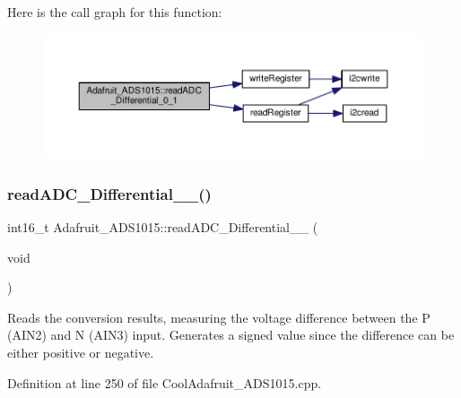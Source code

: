 Here is the call graph for this function\+:
\nopagebreak
\begin{figure}[H]
\begin{center}
\leavevmode
\includegraphics[width=350pt]{class_adafruit___a_d_s1015_a56582333958e66efaccd3d4a8a47e3ff_cgraph}
\end{center}
\end{figure}
\mbox{\label{class_adafruit___a_d_s1015_a38311881bcab46f7496c4bb6e4cad576}} 
\subsubsection{\texorpdfstring{read\+A\+D\+C\+\_\+\+Differential\+\_\+\_()}{readADC\_Differential\_2\_3()}}
{\footnotesize\ttfamily int16\+\_\+t Adafruit\+\_\+\+A\+D\+S1015\+::read\+A\+D\+C\+\_\+\+Differential\+\_\+\_ (\begin{DoxyParamCaption}\item[{void}]{ }\end{DoxyParamCaption})}



Reads the conversion results, measuring the voltage difference between the P (A\+I\+N2) and N (A\+I\+N3) input. Generates a signed value since the difference can be either positive or negative. 



Definition at line 250 of file Cool\+Adafruit\+\_\+\+A\+D\+S1015.\+cpp.

